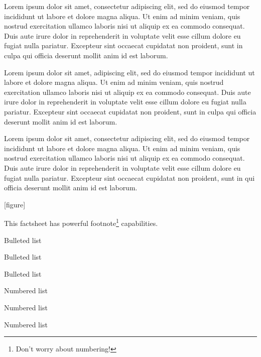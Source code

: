 \documentclass[
  10pt,
]{article}
\author{}
\date{\vspace{-2.5em}}
\begin{document}
\raggedright


Lorem ipsum dolor sit amet, consectetur adipiscing elit, sed do eiusmod
tempor incididunt ut labore et dolore magna aliqua. Ut enim ad minim
veniam, quis nostrud exercitation ullamco laboris nisi ut aliquip ex ea
commodo consequat. Duis aute irure dolor in reprehenderit in voluptate
velit esse cillum dolore eu fugiat nulla pariatur. Excepteur sint
occaecat cupidatat non proident, sunt in culpa qui officia deserunt
mollit anim id est laborum.



Lorem ipsum dolor sit amet, adipiscing elit, sed do eiusmod tempor
incididunt ut labore et dolore magna aliqua. Ut enim ad minim veniam,
quis nostrud exercitation ullamco laboris nisi ut aliquip ex ea commodo
consequat. Duis aute irure dolor in reprehenderit in voluptate velit
esse cillum dolore eu fugiat nulla pariatur. Excepteur sint occaecat
cupidatat non proident, sunt in culpa qui officia deserunt mollit anim
id est laborum.

Lorem ipsum dolor sit amet, consectetur adipiscing elit, sed do eiusmod
tempor incididunt ut labore et dolore magna aliqua. Ut enim ad minim
veniam, quis nostrud exercitation ullamco laboris nisi ut aliquip ex ea
commodo consequat. Duis aute irure dolor in reprehenderit in voluptate
velit esse cillum dolore eu fugiat nulla pariatur. Excepteur sint
occaecat cupidatat non proident, sunt in qui officia deserunt mollit
anim id est laborum.


{[}figure{]}


This factsheet has powerful
footnote\footnote{Don't worry about numbering!} capabilities.

\begin{urbnbullets}
  \item Bulleted list
  \item Bulleted list
  \item Bulleted list
\end{urbnbullets}

\begin{urbnenumerate}
  \item Numbered list
  \item Numbered list
  \item Numbered list
\end{urbnenumerate}
\end{document}
